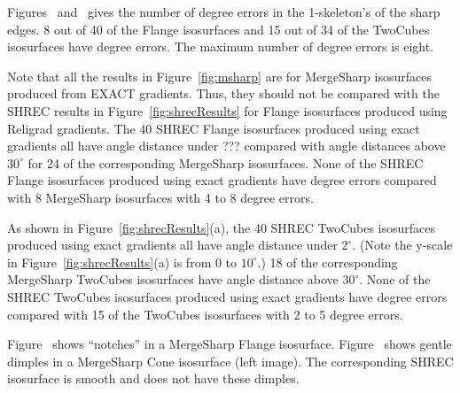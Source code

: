 Figures~ and~
gives the number of degree errors in the 1-skeleton's of the sharp edges.
8 out of 40 of the Flange isosurfaces and 15 out of 34 of the TwoCubes
isosurfaces have degree errors.
The maximum number of degree errors is eight.

Note that all the results in Figure~\ref{fig:msharp} are
for MergeSharp isosurfaces produced from EXACT gradients.
Thus, they should not be compared with the SHREC results
in Figure~\ref{fig:shrecResults} for Flange isosurfaces
produced using Religrad gradients.
The 40 SHREC Flange isosurfaces produced using exact gradients
all have angle distance under ???
compared with angle distances above $30^\circ$
for 24 of the corresponding MergeSharp isosurfaces.
None of the SHREC Flange isosurfaces produced using exact gradients
have degree errors
compared with 8 MergeSharp isosurfaces with 4 to 8 degree errors.

As shown in Figure~\ref{fig:shrecResults}(a),
the 40 SHREC TwoCubes isosurfaces produced using exact gradients
all have angle distance under $2^\circ$.
(Note the y-scale in Figure~\ref{fig:shrecResults}(a)
is from 0 to $10^\circ$.)
18 of the corresponding MergeSharp TwoCubes isosurfaces have
angle distance above $30^\circ$.
None of the SHREC TwoCubes isosurfaces produced using exact gradients
have degree errors
compared with 15 of the TwoCubes isosurfaces with 2 to 5 degree errors.

Figure~\protect{} shows ``notches''
in a MergeSharp Flange isosurface.
Figure~\protect{} shows gentle dimples
in a MergeSharp Cone isosurface (left image).
The corresponding SHREC isosurface is smooth and does not have these dimples.

